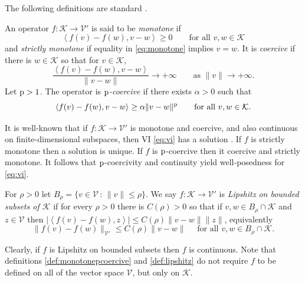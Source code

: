 \documentclass[hidelinks,onefignum,onetabnum,final]{siamart220329}  %
\newcommand{\cK}{\mathcal{K}}
\newcommand{\cV}{\mathcal{V}}
\newcommand{\pp}{{\text{\textnormal{p}}}}
\newcommand{\ip}[2]{\left<#1,#2\right>}
\begin{document}
The following definitions are standard \cite[Chapter III]{KinderlehrerStampacchia1980}.

\begin{definition} \label{def:monotonepcoercive}
An operator $f:\cK \to \cV'$ is said to be \emph{monotone} if
\begin{equation}
\ip{f(v)-f(w)}{v-w} \ge 0 \qquad \text{for all } v,w \in \cK \label{eq:monotone}
\end{equation}
and \emph{strictly monotone} if equality in \eqref{eq:monotone} implies $v=w$.  It is \emph{coercive} if there is $w\in \cK$ so that for $v \in \cK$,
\begin{equation}
\frac{\ip{f(v)-f(w)}{v-w}}{\|v-w\|} \to +\infty \qquad \text{as } \|v\| \to +\infty. \label{eq:coercive}
\end{equation}
Let $\pp>1$.  The operator is \emph{$\pp$-coercive \cite{Bueler2021conservation}} if there exists $\alpha>0$ such that
\begin{equation}
\ip{f(v)-f(w)}{v-w} \ge \alpha \|v-w\|^\pp \qquad \text{for all } v,w \in \cK. \label{eq:pcoercive}
\end{equation}
\end{definition}

It is well-known that if $f:\cK \to \cV'$ is monotone and coercive, and also continuous on finite-dimensional subspaces, then VI \eqref{eq:vi} has a solution \cite[Corollary III.1.8]{KinderlehrerStampacchia1980}.  If $f$ is strictly monotone then a solution is unique.  If $f$ is $\pp$-coercive then it coercive and strictly monotone.  It follows that $\pp$-coercivity and continuity yield well-posedness for \eqref{eq:vi}.

\begin{definition} \label{def:lipshitz}
For $\rho>0$ let $B_\rho = \{v\in \cV\,:\,\|v\|\le \rho\}$.  We say $f:\cK \to \cV'$ is \emph{Lipshitz on bounded subsets of $\cK$} if for every $\rho>0$ there is $C(\rho)>0$ so that if $v,w \in B_\rho \cap \cK$ and $z\in\cV$ then $|\ip{f(v)-f(w)}{z}| \le C(\rho) \|v-w\| \|z\|$, equivalently
\begin{equation}
\|f(v)-f(w)\|_{\cV'} \le C(\rho) \|v-w\| \quad \text{ for all } v,w \in B_\rho \cap \cK.  \label{eq:liponbounded}
\end{equation}
\end{definition}

Clearly, if $f$ is Lipshitz on bounded subsets then $f$ is continuous.  Note that definitions \ref{def:monotonepcoercive} and \ref{def:lipshitz} do not require $f$ to be defined on all of the vector space $\cV$, but only on $\cK$.
\end{document}
